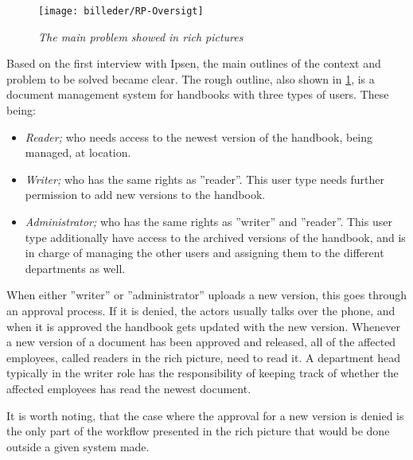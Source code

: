 \begin{figure}[H]
	\centering
	\texttt{[image: billeder/RP-Oversigt]}
	\caption{\textit{The main problem showed in rich pictures
	}}
	\label{fig:RP-Oversigt}
\end{figure}

Based on the first interview with Ipsen, the main outlines of the context and problem to be solved became clear.
The rough outline, also shown in \cref{fig:RP-Oversigt}, is a document management system for handbooks with three types of users. 
These being:
\begin{itemize}
	\item
		\textit{Reader;} who needs access to the newest version of the handbook, being managed, at location.
	\item
		\textit{Writer;} who has the same rights as ''reader''.
		This user type needs further permission to add new versions to the handbook.
	\item
		\textit{Administrator;} who has the same rights as ''writer'' and ''reader''.
		This user type additionally have access to the archived versions of the handbook, and is in charge of managing the other users and assigning them to the different departments as well.
\end{itemize}

When either ''writer'' or ''administrator'' uploads a new version, this goes through an approval process.
If it is denied, the actors usually talks over the phone, and when it is approved the handbook gets updated with the new version.
Whenever a new version of a document has been approved and released, all of the affected employees, called readers in the rich picture, need to read it.
A department head typically in the writer role has the responsibility of keeping track of whether the affected employees has read the newest document.

It is worth noting, that the case where the approval for a new version is denied is the only part of the workflow presented in the rich picture that would be done outside a given system made.

